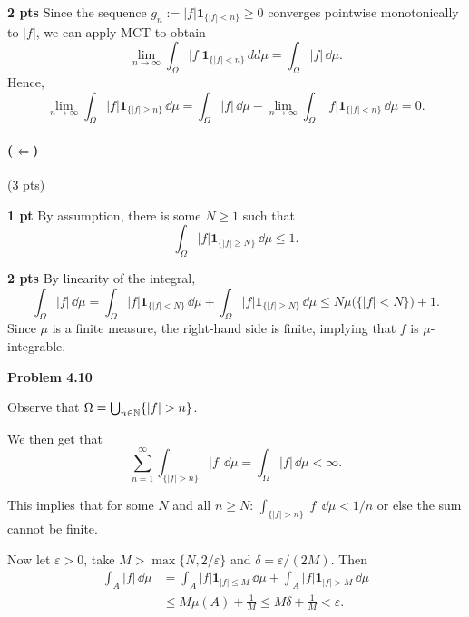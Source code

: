 \textbf{2 pts}
Since the sequence $g_n:= |f|\mathbf{1}_{\{|f|< n\}}\ge 0$ converges pointwise monotonically to $|f|$, we can apply MCT to obtain
\[
	\lim_{n\to\infty} \int_\Omega |f|\mathbf{1}_{\{|f|< n\}}\,dd\mu = \int_\Omega |f|\,\dd\mu.
\]
Hence,
\[	
	\lim_{n\to\infty}\int_\Omega |f|\mathbf{1}_{\{|f|\ge n\}}\,\dd\mu = \int_\Omega |f|\,\dd\mu - \lim_{n\to\infty}\int_\Omega |f|\mathbf{1}_{\{|f|< n\}}\,\dd\mu = 0.
\]

\paragraph{($\Leftarrow$)} (3 pts) 

\textbf{1 pt}
By assumption, there is some $N\ge 1$ such that
\[
	\int_\Omega |f|\mathbf{1}_{\{|f|\ge N\}}\,\dd\mu \le 1.
\]

\textbf{2 pts}
By linearity of the integral,
\[
	\int_\Omega |f|\,\dd\mu = \int_\Omega |f|\mathbf{1}_{\{|f|< N\}}\,\dd\mu +\int_\Omega |f|\mathbf{1}_{\{|f|\ge N\}}\,\dd\mu \le N \mu\bigl(\{|f|< N\}\bigr) + 1.
\]
Since $\mu$ is a finite measure, the right-hand side is finite, implying that $f$ is $\mu$-integrable.

\bigskip
\textbf{Problem 4.10}

Observe that $\Omega = \bigcup_{n \in \mathbb N} \{|f| > n\}$. 

We then get that
\[
	\sum_{n = 1}^\infty \int_{\{|f| > n\}} |f| \, \dd \mu = \int_\Omega |f| \, \dd \mu < \infty.
\]

This implies that for some $N$ and all $n \ge N$: $\int_{\{|f| > n\}} |f| \, \dd \mu < 1/n$ or else the sum cannot be finite.

Now let $\varepsilon > 0$, take $M > \max\{N, 2/\varepsilon\}$ and $\delta = \varepsilon/(2M)$. Then
\begin{align*}
	\int_A |f| \, \dd \mu &= \int_A |f| \mathbf{1}_{|f|\le M} \, \dd \mu + \int_A |f| \mathbf{1}_{|f|> M} \, \dd \mu\\
	&\le M \mu(A) + \frac{1}{M} \le M\delta + \frac{1}{M} < \varepsilon.
\end{align*}


